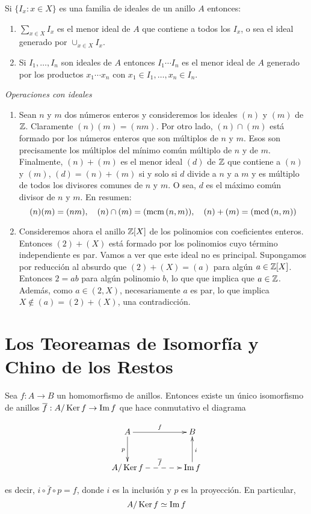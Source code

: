 \begin{prop}
    Si $\{I_x: x\in X\}$ es una familia de ideales de un anillo $A$ entonces:
    \begin{enumerate}[label=(\arabic*)]
        \item $\sum_{x\in X}I_x$ es el menor ideal de $A$ que contiene a todos los $I_x$, o sea el ideal generado por $\cup_{x\in X}I_x$.
        \item Si $I_1,\dots,I_n$ son ideales de $A$ entonces $I_1\cdots I_n$ es el menor ideal de $A$ generado por los productos $x_1\cdots x_n$ con $x_1\in I_1,\dots, x_n\in I_n$.
    \end{enumerate}
\end{prop}

\begin{ej}{\it Operaciones con ideales}
    \begin{enumerate}[label=(\arabic*)]
        \item Sean $n$ y $m$ dos números enteros y consideremos los ideales $(n)$ y $(m)$ de $\mathbb{Z}$. Claramente $(n)(m)=(nm)$. Por otro lado, $(n)\cap(m)$ está formado por los números enteros que son múltiplos de $n$ y $m$. Esos son precisamente los múltiplos del mínimo común múltiplo de $n$ y de $m$. Finalmente, $(n)+(m)$ es el menor ideal $(d)$ de $\mathbb{Z}$ que contiene a $(n)$ y $(m)$, $(d)=(n)+(m)$ si y solo si $d$ divide a $n$ y a $m$ y es múltiplo de todos los divisores comunes de $n$ y $m$. O sea, $d$ es el máximo común divisor de $n$ y $m$. En resumen:
        $$(n)(m)=(nm), \quad (n)\cap(m)=(\operatorname{\rm mcm}\left(n,m\right)), \quad (n)+(m)=(\operatorname{\rm mcd}\left(n,m\right))$$

        \item Consideremos ahora el anillo $\mathbb{Z}[X]$ de los polinomios con coeficientes enteros. Entonces $(2) + (X)$ está formado por los polinomios cuyo término independiente es par. Vamos a ver que este ideal no es principal. Supongamos por reducción al absurdo que $(2)+(X)=(a)$ para algún $a\in\mathbb{Z}[X]$. Entonces $2=ab$ para algún polinomio $b$, lo que que implica que $a\in\mathbb{Z}$. Además, como $a\in (2, X)$, necesariamente $a$ es par, lo que implica $X \notin (a)=(2)+(X)$, una contradicción.
    \end{enumerate}
\end{ej}

\section{ Los Teoreamas de Isomorfía y Chino de los Restos}

\begin{teo}
    Sea $f:A\rightarrow B$ un homomorfismo de anillos. Entonces existe un único isomorfismo de anillos $\overline{f}: A/\operatorname{\rm Ker} f\rightarrow \operatorname{\rm Im} f$ que hace conmutativo el diagrama

    $$\xymatrix@C=1.5cm@R=1cm{ 
        A \ar[r]^f\ar[d]_p                     & B \\ 
        A/\Ker f \ar@{-->}[r]^{\overline{f}}  & \Im f\ar[u]_i 
    }$$
    
    es decir, $i\circ \overline{f} \circ p=f$, donde $i$ es la inclusión y $p$ es la proyección. En particular,
    $$ A/\operatorname{\rm Ker} f\simeq \operatorname{\rm Im} f$$
\end{teo}

